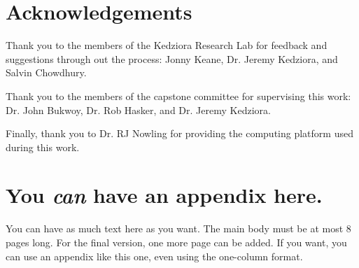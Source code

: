 \documentclass[nohyperref]{article}
\theoremstyle{plain}
\theoremstyle{definition}
\theoremstyle{remark}
\begin{document}
\section*{Acknowledgements}

Thank you to the members of the Kedziora Research Lab for feedback and suggestions through out the process: Jonny Keane, Dr. Jeremy Kedziora, and Salvin Chowdhury.

Thank you to the members of the capstone committee for supervising this work: Dr. John Bukwoy, Dr. Rob Hasker, and Dr. Jeremy Kedziora.

Finally, thank you to Dr. RJ Nowling for providing the computing platform used during this work.

\nocite{langley00}





\newpage
\appendix
\onecolumn
\section{You \emph{can} have an appendix here.}

You can have as much text here as you want. The main body must be at most $8$ pages long.
For the final version, one more page can be added.
If you want, you can use an appendix like this one, even using the one-column format.
\end{document}
